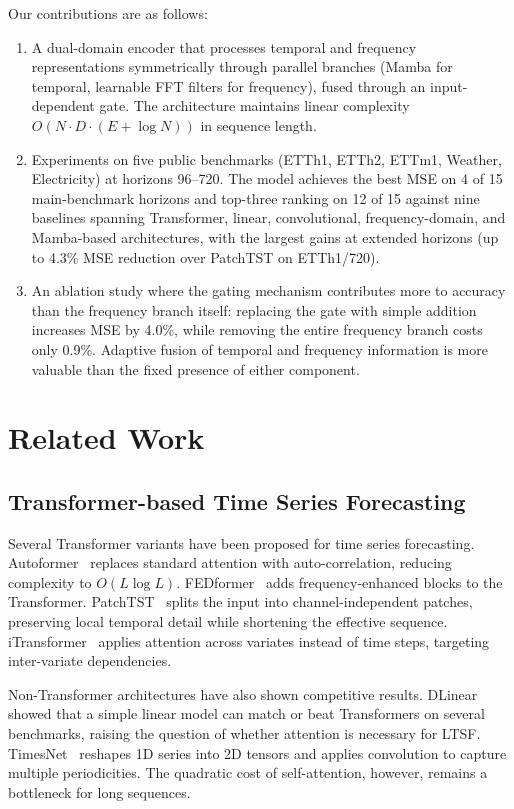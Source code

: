 \documentclass[electronics,article,submit,pdftex,moreauthors]{Definitions/mdpi}
\begin{document}
Our contributions are as follows:

\begin{enumerate}
\item A dual-domain encoder that processes temporal and frequency representations symmetrically through parallel branches (Mamba for temporal, learnable FFT filters for frequency), fused through an input-dependent gate. The architecture maintains linear complexity $O(N \cdot D \cdot (E + \log N))$ in sequence length.
\item Experiments on five public benchmarks (ETTh1, ETTh2, ETTm1, Weather, Electricity) at horizons 96--720. The model achieves the best MSE on 4 of 15 main-benchmark horizons and top-three ranking on 12 of 15 against nine baselines spanning Transformer, linear, convolutional, frequency-domain, and Mamba-based architectures, with the largest gains at extended horizons (up to 4.3\% MSE reduction over PatchTST on ETTh1/720).
\item An ablation study where the gating mechanism contributes more to accuracy than the frequency branch itself: replacing the gate with simple addition increases MSE by 4.0\%, while removing the entire frequency branch costs only 0.9\%. Adaptive fusion of temporal and frequency information is more valuable than the fixed presence of either component.
\end{enumerate}

\section{Related Work}

\subsection{Transformer-based Time Series Forecasting}

Several Transformer variants have been proposed for time series forecasting. Autoformer~\cite{ref6} replaces standard attention with auto-correlation, reducing complexity to $O(L \log L)$. FEDformer~\cite{ref7} adds frequency-enhanced blocks to the Transformer. PatchTST~\cite{ref8} splits the input into channel-independent patches, preserving local temporal detail while shortening the effective sequence. iTransformer~\cite{ref9} applies attention across variates instead of time steps, targeting inter-variate dependencies.

Non-Transformer architectures have also shown competitive results. DLinear~\cite{ref13} showed that a simple linear model can match or beat Transformers on several benchmarks, raising the question of whether attention is necessary for LTSF. TimesNet~\cite{ref14} reshapes 1D series into 2D tensors and applies convolution to capture multiple periodicities. The quadratic cost of self-attention, however, remains a bottleneck for long sequences.
\end{document}
